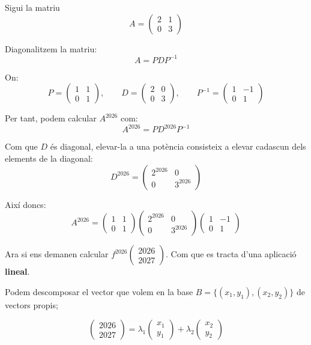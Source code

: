 \documentclass[12pt]{article}
\begin{document}
\begin{examplebox}{}
Sigui la matriu
\[
A = \begin{pmatrix}
2 & 1\\
0 & 3
\end{pmatrix}
\]

Diagonalitzem la matriu:
\[
A = PDP^{-1}
\]

On:
\[
P = \begin{pmatrix}
1 & 1\\
0 & 1
\end{pmatrix},
\qquad
D = \begin{pmatrix}
2 & 0\\
0 & 3
\end{pmatrix},
\qquad
P^{-1} = \begin{pmatrix}
1 & -1\\
0 & 1
\end{pmatrix}
\]

Per tant, podem calcular $A^{2026}$ com:
\[
A^{2026} = PD^{2026}P^{-1}
\]

Com que $D$ és diagonal, elevar-la a una potència consisteix a elevar cadascun dels elements de la diagonal:
\[
D^{2026} =
\begin{pmatrix}
2^{2026} & 0\\
0 & 3^{2026}
\end{pmatrix}
\]

Així doncs:
\[
A^{2026} =
\begin{pmatrix}
1 & 1\\
0 & 1
\end{pmatrix}
\begin{pmatrix}
2^{2026} & 0\\
0 & 3^{2026}
\end{pmatrix}
\begin{pmatrix}
1 & -1\\
0 & 1
\end{pmatrix}
\]

\end{examplebox}

Ara si ens demanen calcular $f^{2026}\begin{pmatrix}
    2026\\
    2027
\end{pmatrix}$. Com que es tracta d'una aplicació \textbf{lineal}.

Podem descomposar el vector que volem en la base $B = \{(x_1,y_1), (x_2,y_2)\}$ de vectors propis;

\[\begin{pmatrix}
    2026\\
    2027
\end{pmatrix} = \lambda_1 \begin{pmatrix}
    x_1\\
    y_1
\end{pmatrix} + \lambda_2  \begin{pmatrix}
    x_2\\
    y_2
\end{pmatrix}\]
\end{document}
